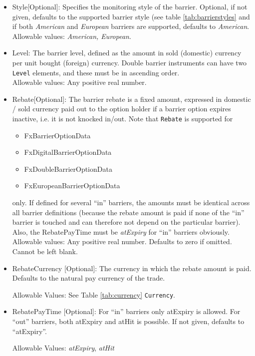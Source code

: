 \begin{itemize}
\item Style[Optional]: Specifies the monitoring style of the barrier. Optional, if not given, defaults to the supported barrier
  style (see table \ref{tab:barrierstyles} and if both \emph{American} and \emph{European} barriers are supported, defaults to
  \emph{American}. \\

Allowable values: \emph{American, European}.

\item Level: The barrier level, defined as the amount in sold (domestic) currency per unit bought (foreign) currency. Double barrier instruments can have two \lstinline!Level! elements, and these must be in ascending order. \\

Allowable values:  Any positive real number.

\item Rebate[Optional]: The barrier rebate is a fixed amount, expressed in domestic / sold currency paid out to the
  option holder if a barrier option expires inactive, i.e. it is not knocked in/out.   Note that \lstinline!Rebate! is
  supported for

\begin{itemize}
  \item FxBarrierOptionData
  \item FxDigitalBarrierOptionData
  \item FxDoubleBarrierOptionData
  \item FxEuropeanBarrierOptionData
\end{itemize}

 only. If defined for several ``in'' barriers, the amounts must be identical across all barrier definitions (because the
 rebate amount is paid if none of the ``in'' barrier is touched and can therefore not depend on the particular
 barrier). Also, the RebatePayTime must be \emph{atExpiry} for ``in'' barriers obviously. \\

Allowable values:  Any positive real number. Defaults to zero if omitted. Cannot be left blank.

\item RebateCurrency [Optional]: The currency in which the rebate amount is paid. Defaults to the natural pay currency
  of the trade.

  Allowable Values: See Table \ref{tab:currency} \lstinline!Currency!.

\item RebatePayTime [Optional]: For ``in'' barriers only atExpiry is allowed. For ``out'' barriers, both atExpiry and
  atHit is possible. If not given, defaults to ``atExpiry''. 

  Allowable Values: \emph{atExpiry}, \emph{atHit}

\end{itemize}

